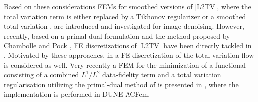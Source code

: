 \documentclass[enabledeprecatedfontcommands,cleardoublepage=empty,headsepline,twoside,11pt,DIV=15,BCOR=12mm,final]{scrartcl}
\begin{document}
Based on these considerations FEMs for smoothed versions of \eqref{L2TV}, where the total variation term is either replaced by a Tikhonov regularizer \cite{Lam} or a smoothed total variation \cite{DesJaoSel, Yao}, are introduced and investigated for image denoising. However, recently, based on a primal-dual formulation and the method proposed by Chambolle and Pock \cite{ChaPoc}, FE discretizations of \eqref{L2TV} have been directly tackled in \cite{Bar2012, Bar2013, TiaYua}. Motivated by these approaches, in \cite{BarNocSal} a FE discretization of the total variation flow is considered as well. 
Very recently a FEM for the minimization of a functional consisting of a combined $L^1/L^2$ data-fidelity term and a total variation regularisation utilizing the primal-dual method of \cite{ChaPoc} is presented in \cite{AlkLan}, where the implementation is performed in DUNE-ACFem.
\end{document}
